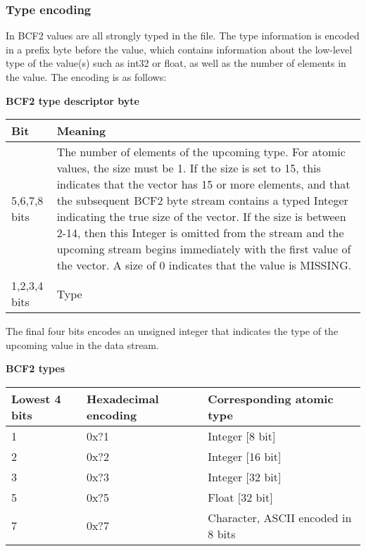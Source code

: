 \documentclass[8pt]{article}
\begin{document}
\subsubsection{Type encoding}

In BCF2 values are all strongly typed in the file.  The type information is encoded in a prefix byte before the value, which contains information about the low-level type of the value(s) such as int32 or float, as well as the number of elements in the value.  The encoding is as follows:

\vspace{0.3cm}
\textbf{BCF2 type descriptor byte}

\vspace{0.3cm}
\begin{tabular}{|p{2cm} | p{10cm}|} \hline
Bit & Meaning \\ \hline
5,6,7,8 bits & The number of elements of the upcoming type.  For atomic values, the size must be 1.  If the size is set to 15, this indicates that the vector has 15 or more elements, and that the subsequent BCF2 byte stream contains a typed Integer indicating the true size of the vector.  If the size is between 2-14, then this Integer is omitted from the stream and the upcoming stream begins immediately with the first value of the vector.  A size of 0 indicates that the value is MISSING. \\ \hline
1,2,3,4 bits & Type \\ \hline
\end{tabular}
\vspace{0.3cm}

The final four bits encodes an unsigned integer that indicates the type of the upcoming value in the data stream.

\textbf{BCF2 types}

\vspace{0.3cm}
\begin{tabular}{|l | l | l|} \hline
Lowest 4 bits & Hexadecimal encoding & Corresponding atomic type \\ \hline
1 & 0x?1 & Integer [8 bit] \\ \hline
2 & 0x?2 & Integer [16 bit] \\ \hline
3 & 0x?3 & Integer [32 bit] \\ \hline
5 & 0x?5 & Float [32 bit] \\ \hline
7 & 0x?7 & Character, ASCII encoded in 8 bits \\ \hline
\end{tabular}
\vspace{0.3cm}
\end{document}
